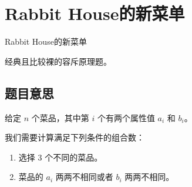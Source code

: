 \def\sectionName{Rabbit House的新菜单}
\section[\TOCName]{\sectionName}



\begin{frame}

\isBeamerMode\relax
    {\Huge \sectionName}\par
\fi




经典且比较裸的容斥原理题。



\end{frame}

\subsection{题目意思}
\begin{frame} %
给定 $n$ 个菜品，其中第 $i$ 个有两个属性值 $a_i$ 和 $b_i$。

我们需要计算满足下列条件的组合数：
\begin{enumerate}
    \item 选择 $3$ 个不同的菜品。
    \item 菜品的 $a_i$ 两两不相同或者 $b_i$ 两两不相同。
\end{enumerate}
\end{frame}



